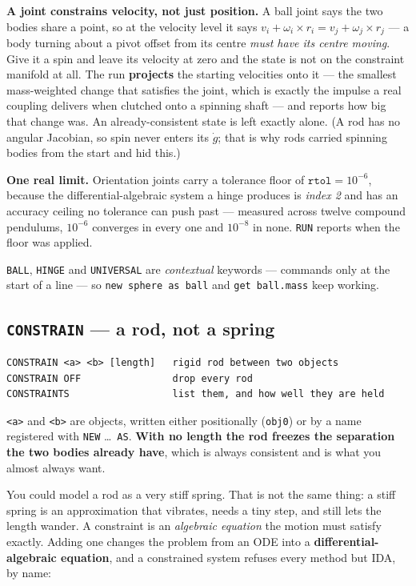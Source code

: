 \documentclass[11pt]{article}
\newcommand{\kw}[1]{\texttt{\uppercase{#1}}}
\newcommand{\code}[1]{\texttt{#1}}
\begin{document}
\textbf{A joint constrains velocity, not just position.} A ball joint
says the two bodies share a point, so at the velocity level it says
$v_i + \omega_i\times r_i = v_j + \omega_j\times r_j$ --- a body turning
about a pivot offset from its centre \emph{must have its centre moving}.
Give it a spin and leave its velocity at zero and the state is not on the
constraint manifold at all. The run \textbf{projects} the starting
velocities onto it --- the smallest mass-weighted change that satisfies
the joint, which is exactly the impulse a real coupling delivers when
clutched onto a spinning shaft --- and reports how big that change was.
An already-consistent state is left exactly alone. (A rod has no angular
Jacobian, so spin never enters its $\dot g$; that is why rods carried
spinning bodies from the start and hid this.)

\textbf{One real limit.} Orientation joints carry a tolerance floor of
$\texttt{rtol}=10^{-6}$, because the differential-algebraic system a
hinge produces is \emph{index 2} and has an accuracy ceiling no tolerance
can push past --- measured across twelve compound pendulums, $10^{-6}$
converges in every one and $10^{-8}$ in none. \kw{run} reports when the
floor was applied.

\kw{ball}, \kw{hinge} and \kw{universal} are \emph{contextual} keywords
--- commands only at the start of a line --- so \code{new sphere as ball}
and \code{get ball.mass} keep working.

\subsection{\kw{constrain} --- a rod, not a spring}

\begin{lstlisting}
CONSTRAIN <a> <b> [length]   rigid rod between two objects
CONSTRAIN OFF                drop every rod
CONSTRAINTS                  list them, and how well they are held
\end{lstlisting}

\code{<a>} and \code{<b>} are objects, written either positionally
(\code{obj0}) or by a name registered with \kw{new} \dots\ \kw{as}.
\textbf{With no length the rod freezes the separation the two bodies
already have}, which is always consistent and is what you almost always
want.

You could model a rod as a very stiff spring. That is not the same
thing: a stiff spring is an approximation that vibrates, needs a tiny
step, and still lets the length wander. A constraint is an
\emph{algebraic equation} the motion must satisfy exactly. Adding one
changes the problem from an ODE into a \textbf{differential-algebraic
equation}, and a constrained system refuses every method but IDA, by
name:
\end{document}

